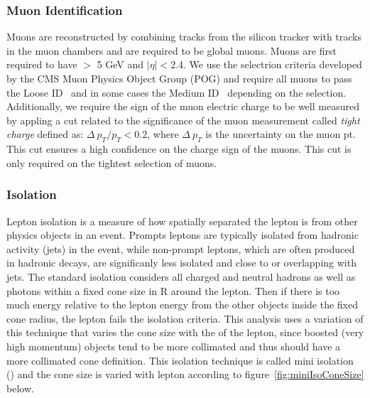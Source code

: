 \subsubsection{Muon Identification}
Muons are reconstructed by combining tracks from the silicon tracker with tracks in the muon chambers and are required to be global muons. Muons are first required to have \pt $>$ 5 GeV and
$|\eta|<$2.4. We use the selectrion criteria developed by the CMS
Muon Physics Object Group (POG) and require all muons to pass the Loose ID~\cite{loosemuon} and in some cases the Medium ID~\cite{mediummuon} depending on the selection. Additionally, we require
the sign of the muon electric charge to be well measured by appling a cut related to the significance of the muon \pt measurement called \emph{tight charge} defined as: $\Delta~p_{T}/p_{T} < 0.2$,
where $\Delta~p_{T}$ is the uncertainty on the muon pt. This cut ensures a high confidence on the charge sign of the muons. This cut is only required on the tightest selection of muons.  

\subsubsection{Isolation}
Lepton isolation is a measure of how spatially separated the lepton is from other physics objects in an event. Prompts leptons are typically isolated from hadronic activity
(jets) in the event, while non-prompt leptons, which are often produced in hadronic decays, are significanly less isolated and close to or overlapping with jets. The standard isolation considers
all charged and neutral hadrons as well as photons within a fixed cone size in R around the lepton. Then if there is too much energy relative to the lepton energy from the
other objects inside the fixed cone radius, the lepton fails the isolation criteria. This analysis uses a variation of this technique that varies the cone size with the \pt of the lepton, since
boosted (very high momentum) objects tend to be more collimated and thus should have a more collimated cone definition. This isolation technique is called mini isolation (\miniIso) and the cone
size is varied with lepton \pt according to figure~\ref{fig:miniIsoConeSize} below. 

